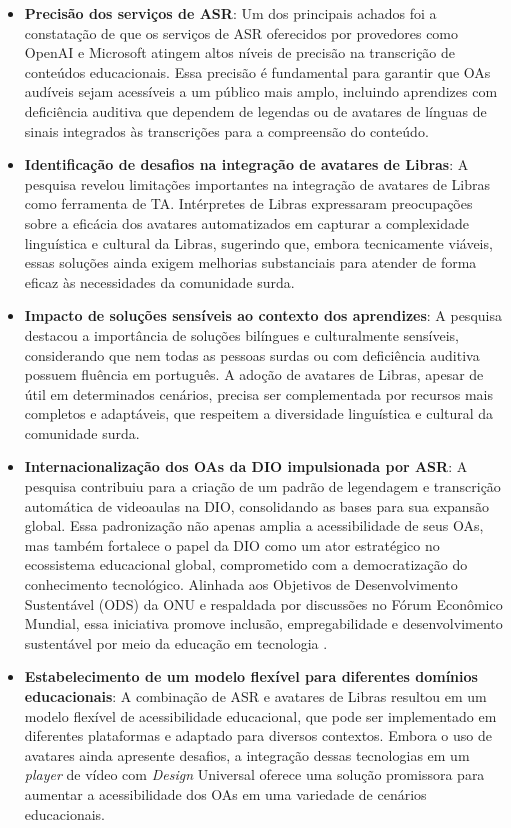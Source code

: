 \begin{itemize}
    \item \textbf{Precisão dos serviços de ASR}: Um dos principais achados foi a constatação de que os serviços de ASR oferecidos por provedores como OpenAI e Microsoft atingem altos níveis de precisão na transcrição de conteúdos educacionais. Essa precisão é fundamental para garantir que OAs audíveis sejam acessíveis a um público mais amplo, incluindo aprendizes com deficiência auditiva que dependem de legendas ou de avatares de línguas de sinais integrados às transcrições para a compreensão do conteúdo.

    \item \textbf{Identificação de desafios na integração de avatares de Libras}: A pesquisa revelou limitações importantes na integração de avatares de Libras como ferramenta de TA. Intérpretes de Libras expressaram preocupações sobre a eficácia dos avatares automatizados em capturar a complexidade linguística e cultural da Libras, sugerindo que, embora tecnicamente viáveis, essas soluções ainda exigem melhorias substanciais para atender de forma eficaz às necessidades da comunidade surda.

    \item \textbf{Impacto de soluções sensíveis ao contexto dos aprendizes}: A pesquisa destacou a importância de soluções bilíngues e culturalmente sensíveis, considerando que nem todas as pessoas surdas ou com deficiência auditiva possuem fluência em português. A adoção de avatares de Libras, apesar de útil em determinados cenários, precisa ser complementada por recursos mais completos e adaptáveis, que respeitem a diversidade linguística e cultural da comunidade surda.

    \item \textbf{Internacionalização dos OAs da DIO impulsionada por ASR}: A pesquisa contribuiu para a criação de um padrão de legendagem e transcrição automática de videoaulas na DIO, consolidando as bases para sua expansão global. Essa padronização não apenas amplia a acessibilidade de seus OAs, mas também fortalece o papel da DIO como um ator estratégico no ecossistema educacional global, comprometido com a democratização do conhecimento tecnológico. Alinhada aos Objetivos de Desenvolvimento Sustentável (ODS) da ONU e respaldada por discussões no Fórum Econômico Mundial, essa iniciativa promove inclusão, empregabilidade e desenvolvimento sustentável por meio da educação em tecnologia \cite{dio2023}.

    \item \textbf{Estabelecimento de um modelo flexível para diferentes domínios educacionais}: A combinação de ASR e avatares de Libras resultou em um modelo flexível de acessibilidade educacional, que pode ser implementado em diferentes plataformas e adaptado para diversos contextos. Embora o uso de avatares ainda apresente desafios, a integração dessas tecnologias em um \textit{player} de vídeo com \textit{Design} Universal oferece uma solução promissora para aumentar a acessibilidade dos OAs em uma variedade de cenários educacionais.
\end{itemize}

